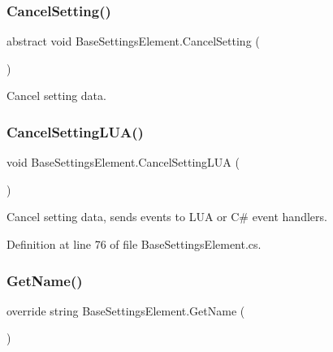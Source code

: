 \subsubsection{\texorpdfstring{Cancel\+Setting()}{CancelSetting()}}
{\footnotesize\ttfamily abstract void Base\+Settings\+Element.\+Cancel\+Setting (\begin{DoxyParamCaption}{ }\end{DoxyParamCaption})\hspace{0.3cm}{\ttfamily [pure virtual]}}



Cancel setting data. 

\mbox{\label{class_base_settings_element_a540fa858362bb8643d88c03c28d4e455}} 
\subsubsection{\texorpdfstring{Cancel\+Setting\+L\+U\+A()}{CancelSettingLUA()}}
{\footnotesize\ttfamily void Base\+Settings\+Element.\+Cancel\+Setting\+L\+UA (\begin{DoxyParamCaption}{ }\end{DoxyParamCaption})}



Cancel setting data, sends events to L\+UA or C\# event handlers. 



Definition at line 76 of file Base\+Settings\+Element.\+cs.

\mbox{\label{class_base_settings_element_a01da3ad61726996dfbf111a2bcabe166}} 
\subsubsection{\texorpdfstring{Get\+Name()}{GetName()}}
{\footnotesize\ttfamily override string Base\+Settings\+Element.\+Get\+Name (\begin{DoxyParamCaption}{ }\end{DoxyParamCaption})\hspace{0.3cm}{\ttfamily [virtual]}}



